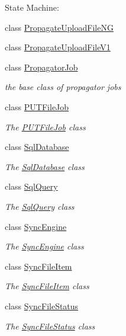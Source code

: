 \begin{DoxyCompactItemize}
\begin{DoxyCompactList}
State Machine\+: \end{DoxyCompactList}\item 
class \hyperlink{class_o_c_c_1_1_propagate_upload_file_n_g}{Propagate\+Upload\+File\+NG}
\item 
class \hyperlink{class_o_c_c_1_1_propagate_upload_file_v1}{Propagate\+Upload\+File\+V1}
\item 
class \hyperlink{class_o_c_c_1_1_propagator_job}{Propagator\+Job}
\begin{DoxyCompactList}\small\item\em the base class of propagator jobs \end{DoxyCompactList}\item 
class \hyperlink{class_o_c_c_1_1_p_u_t_file_job}{P\+U\+T\+File\+Job}
\begin{DoxyCompactList}\small\item\em The \hyperlink{class_o_c_c_1_1_p_u_t_file_job}{P\+U\+T\+File\+Job} class \end{DoxyCompactList}\item 
class \hyperlink{class_o_c_c_1_1_sql_database}{Sql\+Database}
\begin{DoxyCompactList}\small\item\em The \hyperlink{class_o_c_c_1_1_sql_database}{Sql\+Database} class \end{DoxyCompactList}\item 
class \hyperlink{class_o_c_c_1_1_sql_query}{Sql\+Query}
\begin{DoxyCompactList}\small\item\em The \hyperlink{class_o_c_c_1_1_sql_query}{Sql\+Query} class \end{DoxyCompactList}\item 
class \hyperlink{class_o_c_c_1_1_sync_engine}{Sync\+Engine}
\begin{DoxyCompactList}\small\item\em The \hyperlink{class_o_c_c_1_1_sync_engine}{Sync\+Engine} class \end{DoxyCompactList}\item 
class \hyperlink{class_o_c_c_1_1_sync_file_item}{Sync\+File\+Item}
\begin{DoxyCompactList}\small\item\em The \hyperlink{class_o_c_c_1_1_sync_file_item}{Sync\+File\+Item} class \end{DoxyCompactList}\item 
class \hyperlink{class_o_c_c_1_1_sync_file_status}{Sync\+File\+Status}
\begin{DoxyCompactList}\small\item\em The \hyperlink{class_o_c_c_1_1_sync_file_status}{Sync\+File\+Status} class \end{DoxyCompactList}\item 

\end{DoxyCompactItemize}

